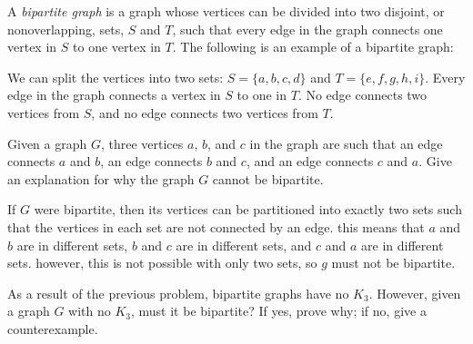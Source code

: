 \documentclass[11pt]{article}
\begin{document}
\begin{definition}
\label{def:bipartite}
A \textit{bipartite graph} is a graph whose vertices can be divided into two disjoint, or nonoverlapping, sets, $S$ and $T$, such that every
edge in the graph connects one vertex in $S$ to one vertex in $T$. The following is an example of a bipartite graph:
\begin{center}
\end{center}
We can split the vertices into two sets: $S=\{a,b,c,d\}$ and $T=\{e,f,g,h,i\}$. Every edge in the graph connects a vertex in $S$ to
one in $T$. No edge connects two vertices from $S$, and no edge connects two vertices from $T$.
\end{definition}

\begin{problem}[2 points] %
Given a graph $G$, three vertices $a$, $b$, and $c$ in the graph are such that an edge connects $a$ and $b$, an edge connects $b$ and $c$, and an edge
connects $c$ and $a$. Give an explanation for why the graph $G$ cannot be bipartite.
\end{problem}

\begin{solution}
If $G$ were bipartite, then its vertices can be partitioned into exactly two sets such that the vertices in each set are not connected by an edge.
this means that $a$ and $b$ are in different sets, $b$ and $c$ are in different sets, and $c$ and $a$ are in different sets. however, this is not possible
with only two sets, so $g$ must not be bipartite.
\end{solution}

\begin{problem}[2 points] %
As a result of the previous problem, bipartite graphs have no $K_3$. However, given a graph $G$ with no $K_3$, must it be bipartite? If yes, prove why; if no, give a counterexample.
\end{problem}
\end{document}
